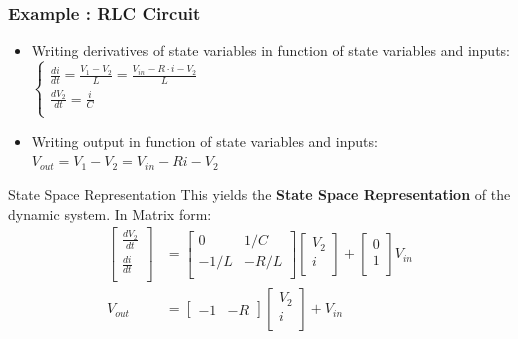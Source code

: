 \begin{frame}
	
	\frametitle{Example : RLC Circuit}
	\begin{itemize}
		\item Writing derivatives of state variables in function of state variables and inputs: 
		$ \left\lbrace  \begin{matrix}
							\frac{di}{dt} = \frac{V_1 - V_2}{L} = \frac{V_{in} - R\cdot i - V_2}{L} \\
							\frac{dV_2}{dt} 
							= \frac{i}{C}	\\
						\end{matrix} 
		  \right. 
		$
		\item Writing output in function of state variables and inputs: $V_{out} = V_1 - V_2 = V_{in} - Ri - V_2$
	\end{itemize}
	\begin{block}{State Space Representation}
		This yields the \textbf{State Space Representation} of the dynamic system. In Matrix form:
		\begin{align*}
			\begin{bmatrix}
				\frac{dV_2}{dt} \\
				\frac{di}{dt} \\
			\end{bmatrix} 
			&= 
			\begin{bmatrix}
				0 & 1/C \\
				-1/L & -R/L  \\
			\end{bmatrix} 	
			\begin{bmatrix}
				V_2 \\
				i \\
			\end{bmatrix}
			+ 
			\begin{bmatrix}
				0 \\
				1 \\
			\end{bmatrix}
			V_{in} 
			\\
			V_{out} &= 
				\begin{bmatrix}
					-1 & -R
				\end{bmatrix}
				\begin{bmatrix}
					V_2 \\
					i \\
				\end{bmatrix}
				 + V_{in}
		\end{align*}
	\end{block}	
\end{frame}

